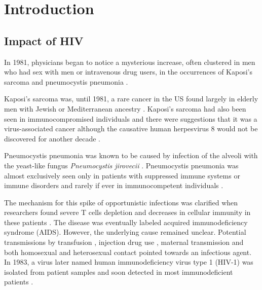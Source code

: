 \documentclass[../sherrill-Mix_thesis.tex]{subfiles}
\begin{document}
\graphicspath{{im/}{intro/im/}}
\chapter{Introduction}
\section{Impact of HIV}
	In 1981, physicians began to notice a mysterious increase, often clustered in men who had sex with men or intravenous drug users, in the occurrences of Kaposi's sarcoma and pneumocystis pneumonia \citep{Gottlieb1981,Friedman-Kien1981,Hymes1981,Masur1981,Siegal1981,Gottlieb1981a}. 
	
	Kaposi's sarcoma was, until 1981, a rare cancer in the US found largely in elderly men with Jewish or Mediterranean ancestry \citep{Laor1979}. Kaposi's sarcoma had also been seen in immunocompromised individuals \citep{Klein1974,Myers1974,Kapadia1977} and there were suggestions that it was a virus-associated cancer \citep{Safai1981} although the causative human herpesvirus 8 would not be discovered for another decade \citep{Chang1994,Sitas1999}. 
	
	Pneumocystis pneumonia was known to be caused by infection of the alveoli with the yeast-like fungus \emph{Pneumocystis jirovecii} \citep{Burke1973,Hughes1977}. Pneumocystis pneumonia was almost exclusively seen only in patients with suppressed immune systems or immune disorders and rarely if ever in immunocompetent individuals \citep{Hughes1977}. %

	The mechanism for this spike of opportunistic infections was clarified when researchers found severe T cells depletion and decreases in cellular immunity in these patients \citep{Masur1981,Siegal1981,Gottlieb1981a,Gerstoft1982,Masur1982}. The disease was eventually labeled acquired immunodeficiency syndrome (AIDS). However, the underlying cause remained unclear. Potential transmissions by transfusion \citep{Ammann1982,Ehrenkranz1982,Poon1982}, injection drug use \citep{Masur1981,Masur1982,Greene1982}, maternal transmission \citep{OReilly1982} and both homosexual \citep{Fannin1982,Gerstoft1982} and heterosexual \citep{Masur1982,Harris1983} contact pointed towards an infectious agent. In 1983, a virus later named human immunodeficiency virus type 1 (HIV-1) was isolated from patient samples \citep{Barre-Sinoussi1983,Gallo1983,Popovic1984,Levy1984} and soon detected in most immunodeficient patients \citep{Gallo1984,Sarngadharan1984,Safai1984,Levy1984}. 
\end{document}
